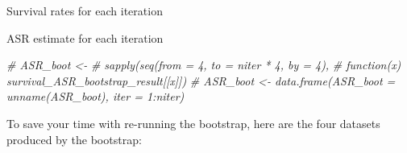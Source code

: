 \documentclass[]{article}
\newenvironment{Shaded}{\begin{snugshade}}{\end{snugshade}}
\newcommand{\CommentTok}[1]{\textcolor[rgb]{0.56,0.35,0.01}{\textit{{#1}}}}
\begin{document}
Survival rates for each iteration

\begin{Shaded}
\end{Shaded}

ASR estimate for each iteration

\begin{Shaded}
\begin{Highlighting}[]
\CommentTok{# ASR_boot <- }
\CommentTok{# sapply(seq(from = 4, to = niter * 4, by = 4), }
\CommentTok{#        function(x) survival_ASR_bootstrap_result[[x]])}
\CommentTok{# ASR_boot <- data.frame(ASR_boot = unname(ASR_boot), iter = 1:niter)}
\end{Highlighting}
\end{Shaded}

To save your time with re-running the bootstrap, here are the four
datasets produced by the bootstrap:
\end{document}
